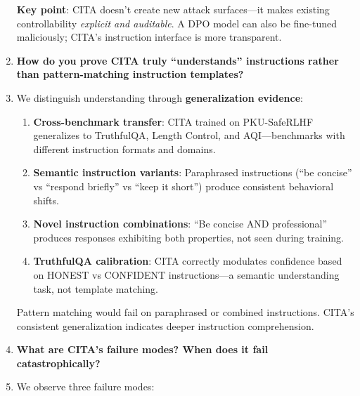 \begin{enumerate}[label=\textbf{Q\arabic*.}, leftmargin=*, itemsep=8pt]
\textbf{Key point}: CITA doesn't create new attack surfaces---it makes existing controllability \textit{explicit and auditable}. A DPO model can also be fine-tuned maliciously; CITA's instruction interface is more transparent.

\vspace{4mm}

\item[\ding{93}] \textbf{How do you prove CITA truly ``understands'' instructions rather than pattern-matching instruction templates?}

\item[\ding{224}] We distinguish understanding through \textbf{generalization evidence}:

\begin{enumerate}[leftmargin=*,itemsep=2pt]
    \item \textbf{Cross-benchmark transfer}: CITA trained on PKU-SafeRLHF generalizes to TruthfulQA, Length Control, and AQI---benchmarks with different instruction formats and domains.

    \item \textbf{Semantic instruction variants}: Paraphrased instructions (``be concise'' vs ``respond briefly'' vs ``keep it short'') produce consistent behavioral shifts.

    \item \textbf{Novel instruction combinations}: ``Be concise AND professional'' produces responses exhibiting both properties, not seen during training.

    \item \textbf{TruthfulQA calibration}: CITA correctly modulates confidence based on HONEST vs CONFIDENT instructions---a semantic understanding task, not template matching.
\end{enumerate}

Pattern matching would fail on paraphrased or combined instructions. CITA's consistent generalization indicates deeper instruction comprehension.

\vspace{4mm}

\item[\ding{93}] \textbf{What are CITA's failure modes? When does it fail catastrophically?}

\item[\ding{224}] We observe three failure modes:


\end{enumerate}
